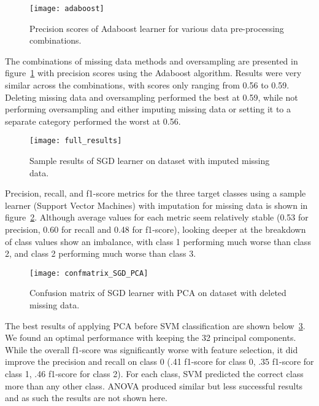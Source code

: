 \documentclass[conference]{IEEEtran}
\begin{document}
\begin{figure}[htpb]
	\centering
	\texttt{[image: adaboost]}
	\caption{Precision scores of Adaboost learner for various data pre-processing combinations.}
	\label{fig:adaboost}
\end{figure}

The combinations of missing data methods and oversampling are presented in figure~\ref{fig:adaboost} with precision scores using the Adaboost algorithm. Results were very similar across the combinations, with scores only ranging from 0.56 to 0.59. Deleting missing data and oversampling performed the best at 0.59, while not performing oversampling and either imputing missing data or setting it to a separate category performed the worst at 0.56.

\begin{figure}[htpb]
	\centering
	\texttt{[image: full\_results]}
	\caption{Sample results of SGD learner on dataset with imputed missing data.}
	\label{fig:full_results}
\end{figure}

Precision, recall, and f1-score metrics for the three target classes using a sample learner (Support Vector Machines) with imputation for missing data is shown in figure~\ref{fig:full_results}. Although average values for each metric seem relatively stable (0.53 for precision, 0.60 for recall and 0.48 for f1-score), looking deeper at the breakdown of class values show an imbalance, with class 1 performing much worse than class 2, and class 2 performing much worse than class 3.

\begin{figure}[htpb]
	\centering
	\texttt{[image: confmatrix\_SGD\_PCA]}
	\caption{Confusion matrix of SGD learner with PCA on dataset with deleted missing data.}
	\label{fig:sgd_pca_results}
\end{figure}

The best results of applying PCA before SVM classification are shown below~\ref{fig:sgd_pca_results}. We found an optimal performance with keeping the 32 principal components. While the overall f1-score was significantly worse with feature selection, it did improve the precision and recall on class 0 (.41 f1-score for class 0, .35 f1-score for class 1, .46 f1-score for class 2). For each class, SVM predicted the correct class more than any other class. ANOVA produced similar but less successful results and as such the results are not shown here.
\end{document}
